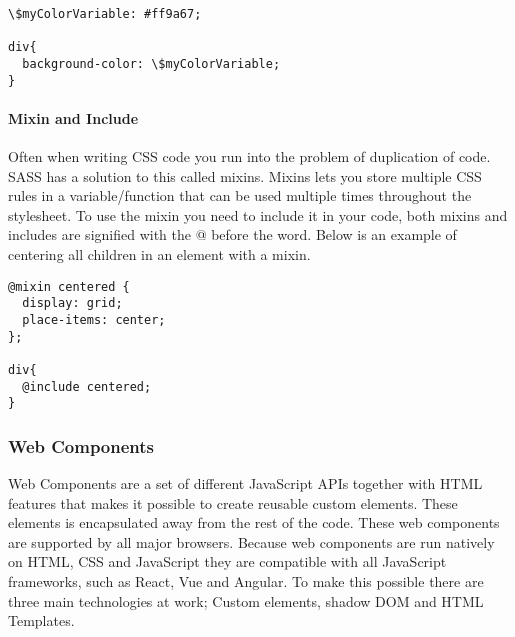 \begin{lstlisting}[style=htmlcssjs]
\$myColorVariable: #ff9a67; 

div{
  background-color: \$myColorVariable;
}
\end{lstlisting}


\paragraph{Mixin and Include}
Often when writing CSS code you run into the problem of duplication of code. SASS has a solution to this called mixins. Mixins lets you store multiple CSS rules in a variable/function that can be used multiple times throughout the stylesheet. To use the mixin you need to include it in your code, both mixins and includes are signified with the @ before the word. Below is an example of centering all children in an element with a mixin.

\begin{lstlisting}[style=htmlcssjs]
@mixin centered {
  display: grid;
  place-items: center;
}; 

div{
  @include centered; 
}
\end{lstlisting}








\subsubsection{Web Components}%
\label{sub:Web Components}
Web Components are a set of different JavaScript APIs together with HTML features that makes it possible to create reusable custom elements\cite{WebComponentsMDN}. These elements is encapsulated away from the rest of the code. These web components are supported by all major browsers. Because web components are run natively on HTML, CSS and JavaScript they are compatible with all JavaScript frameworks, such as React, Vue and Angular. To make this possible there are three main technologies at work; Custom elements, shadow DOM and HTML Templates.

